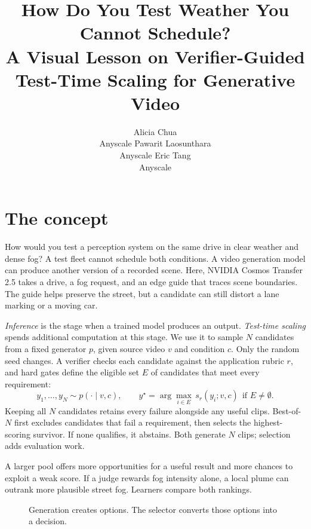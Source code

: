 \documentclass{article}
\title{How Do You Test Weather You Cannot Schedule?\\
\large A Visual Lesson on Verifier-Guided Test-Time Scaling for Generative Video}
\author{%
  Alicia Chua\\
  Anyscale
  \And
  Pawarit Laosunthara\\
  Anyscale
  \And
  Eric Tang\\
  Anyscale
}
\begin{document}
\maketitle

\section{The concept}

How would you test a perception system on the same drive in clear weather and dense fog? A test fleet cannot schedule both conditions. A video generation model can produce another version of a recorded scene. Here, NVIDIA Cosmos Transfer 2.5 takes a drive, a fog request, and an edge guide that traces scene boundaries. The guide helps preserve the street, but a candidate can still distort a lane marking or a moving car.

\emph{Inference} is the stage when a trained model produces an output. \emph{Test-time scaling} spends additional computation at this stage. We use it to sample $N$ candidates from a fixed generator $p$, given source video $v$ and condition $c$. Only the random seed changes. A verifier checks each candidate against the application rubric $r$, and hard gates define the eligible set $E$ of candidates that meet every requirement:
\begin{equation*}
 y_1,\ldots,y_N \sim p(\cdot\mid v,c),
 \qquad y^\star=\arg\max_{i\in E}\, s_r(y_i;v,c)\ \ \text{if } E\neq\emptyset.
\end{equation*}
Keeping all $N$ candidates retains every failure alongside any useful clips. Best-of-$N$ first excludes candidates that fail a requirement, then selects the highest-scoring survivor. If none qualifies, it abstains. Both generate $N$ clips; selection adds evaluation work.

A larger pool offers more opportunities for a useful result and more chances to exploit a weak score. If a judge rewards fog intensity alone, a local plume can outrank more plausible street fog. Learners compare both rankings.

\begin{figure}[h]
\centering
{}
\caption{Generation creates options. The selector converts those options into a decision.}
\end{figure}
\end{document}
